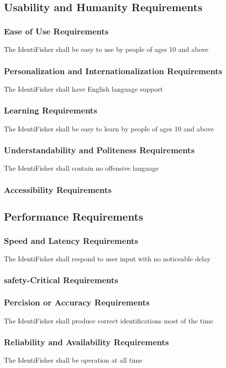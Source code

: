 \documentclass{article}
\begin{document}
\subsection{Usability and Humanity Requirements}
\subsubsection{Ease of Use Requirements}
The IdentiFisher shall be easy to use by people of ages 10 and above
\subsubsection{Personalization and Internationalization Requirements}
The IdentiFisher shall have English language support
\subsubsection{Learning Requirements}
The IdentiFisher shall be easy to learn by people of ages 10 and above
\subsubsection{Understandability and Politeness Requirements}
The IdentiFisher shall contain no offensive language
\subsubsection{Accessibility Requirements}

\subsection{Performance Requirements}
\subsubsection{Speed and Latency Requirements}
The IdentiFisher shall respond to user input with no noticeable delay
\subsubsection{safety-Critical Requirements}

\subsubsection{Percision or Accuracy Requirements}
The IdentiFisher shall produce correct identifications most of the time
\subsubsection{Reliability and Availability Requirements}
The IdentiFisher shall be operation at all time
\end{document}
